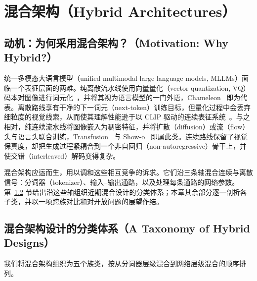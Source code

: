 
\section{混合架构（Hybrid Architectures）}
\label{sec:hybrid}

\subsection{动机：为何采用混合架构？（Motivation: Why Hybrid?）}
\label{subsec:hybrid-motivation}

统一多模态大语言模型（unified multimodal large language models, MLLMs）面临一个表征层面的两难。纯离散流水线使用向量量化（vector quantization, VQ）码本对图像进行词元化~\cite{DBLP:conf/nips/OordVK17,DBLP:conf/cvpr/EsserRO21,yu2024magvitv2}，并将其视为语言模型的一门外语，Chameleon~\cite{team2024chameleon} 即为代表。离散路线享有干净的下一词元（next-token）训练目标，但量化过程中会丢弃细粒度的视觉线索，从而使其理解性能逊于以 CLIP 驱动的连续表征系统~\cite{lin2025toklip,DBLP:conf/cvpr/YangYZRZ0Z25}。与之相对，纯连续流水线将图像嵌入为稠密特征，并将扩散（diffusion）或流（flow）头与语言头联合训练，Transfusion~\cite{zhou2024transfusion} 与 Show-o~\cite{xie2024showo} 即属此类。连续路线保留了视觉保真度，却把生成过程紧耦合到一个非自回归（non-autoregressive）骨干上，并使交错（interleaved）解码变得复杂。

混合架构应运而生，用以调和这些相互竞争的诉求。它们沿三条轴混合连续与离散信号：分词器（tokenizer）、输入--输出通路，以及处理每条通路的网络参数。第~\ref{subsec:hybrid-taxonomy} 节给出沿这些轴组织近期混合设计的分类体系；本章其余部分逐一剖析各子类，并以一项跨族对比和对开放问题的展望作结。

\subsection{混合架构设计的分类体系（A Taxonomy of Hybrid Designs）}
\label{subsec:hybrid-taxonomy}

我们将混合架构组织为五个族类，按从分词器层级混合到网络层级混合的顺序排列。

